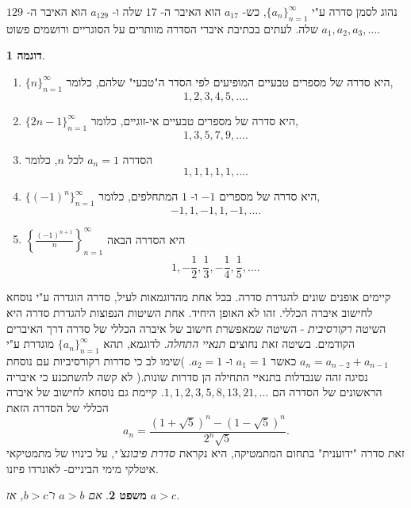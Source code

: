 \documentclass[12pt]{book}
\theoremstyle{plain}
\newtheorem{theorem}{משפט}[chapter]
\theoremstyle{definition}
\newtheorem{example}[theorem]{דוגמה}
\begin{document}
נהוג לסמן סדרה ע"י 
$\{a_n\}_{n=1}^\infty$, 
כש- 
$a_{17}$ 
הוא האיבר ה- 
$17$ 
שלה ו- 
$a_{129}$ 
הוא האיבר ה- 
$129$ 
שלה. 
לעתים בכתיבת איברי הסדרה מוותרים על הסוגריים ורושמים פשוט 
$a_1,a_2,a_3,\ldots$. 

\begin{example}\rm
    \begin{enumerate}
         \item 
$\{n\}_{n=1}^\infty$ 
היא סדרה של מספרים טבעיים המופיעים לפי הסדר ה"טבעי" שלהם, כלומר,
$$1,2,3,4,5,\ldots.$$
\item $\{2n-1\}_{n=1}^\infty$ 
היא סדרה של מספרים טבעיים אי-זוגיים, 
כלומר, 
$$1,3,5,7,9,\ldots.$$
\item הסדרה 
$a_n=1$ 
לכל 
$n$, 
כלומר 
$$1,1,1,1,1,\ldots.$$
\item $\{(-1)^n\}_{n=1}^\infty$ 
היא סדרה של מספרים 
$-1$ 
ו- 
$1$ 
המתחלפים, כלומר, 
$$-1,1,-1,1,-1,\ldots.$$
\item $\left\{\frac{(-1)^{n+1}}{n}\right\}_{n=1}^\infty$ 
היא הסדרה הבאה 
$$1,-\frac{1}{2},\frac{1}{3},-\frac{1}{4},\frac{1}{5},\ldots.$$
    \end{enumerate}
\end{example}


קיימים אופנים שונים להגדרת סדרה. בכל אחת מהדוגמאות לעיל, סדרה הוגדרה ע"י נוסחא לחישוב איברה הכללי. 
זהו לא האופן היחיד. 
אחת השיטות הנפוצות להגדרת סדרה היא השיטה 
{\it רקורסיבית} - 
השיטה שמאפשרת חישוב של איברה הכללי של סדרה דרך האיברים הקודמים. בשיטה זאת נחוצים 
{\it תנאיי התחלה}. 
לדוגמא, 
תהא 
$\{a_n\}_{n=1}^\infty$ 
מוגדרת ע"י 
$a_{n}=a_{n-2}+a_{n-1}$ 
כאשר 
$a_1=1$
ו- 
$a_2=1$. 
)שימו לב כי סדרות רקורסיביות עם נוסחת נסיגה זהה שנבדלות בתנאיי התחילה הן סדרות שונות.(
לא קשה להשתכנע כי איבריה הראשונים של הסדרה הם
$1,1,2,3,5,8,13,21,\ldots$. 
קיימת גם נוסחא לחישוב של איברה הכללי של הסדרה הזאת
$$a_n=\frac{(1+\sqrt{5})^n-(1-\sqrt{5})^n}{2^n\sqrt{5}}.$$
זאת סדרה "ידוענית" בתחום המתמטיקה, היא נקראת 
{\it סדרת פיבונצ'י}, 
על כינויו של מתמטיקאי איטלקי מימי הביניים- לאונרדו פיזנו.

\begin{theorem}
אם \( a > b \) ו־\( b > c \), אז \( a > c \).
\end{theorem}
\end{document}
